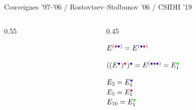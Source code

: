 \documentclass[aspectratio=169]{beamer}
\begin{document}

\begin{frame}{Couveignes '97-'06 / Rostovtsev--Stolbunov '06 / CSIDH '19}
  \begin{columns}
    \begin{column}{0.55\textwidth}
    \end{column}
    \begin{column}{0.45\textwidth}
      \large
      \begin{description}
        \setlength{\itemsep}{1em}
      \item<3->[Commutative]
        $E^{(\textcolor{red}{\bullet}\textcolor{blue}{\bullet})} = E^{(\textcolor{blue}{\bullet}\textcolor{red}{\bullet})}$
      \item<2->[Group]
        $((E^{\textcolor{blue}{\bullet}})^{\textcolor{red}{\bullet}})^{\textcolor{blue}{\bullet}} = E^{(\textcolor{blue}{\bullet}\textcolor{red}{\bullet}\textcolor{blue}{\bullet})} = E_1^{\textcolor{green}{\bullet}}$
      \item[Action]
        $E_2 = E_1^{\textcolor{blue}{\bullet}}$\\
        $E_5 = E_1^{\textcolor{red}{\bullet}}$\\
        $E_{10} = E_1^{\textcolor{green}{\bullet}}$
      \end{description}
    \end{column}
  \end{columns}
\end{frame}

\end{document}
